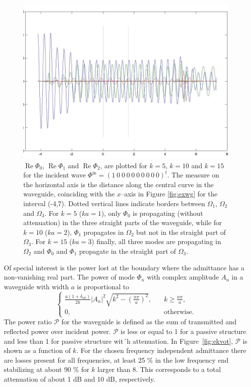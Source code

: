 \documentclass[numreferences]{kluwer}
\providecommand{\abs}[1]{\left\lvert#1\right\rvert}
\renewcommand{\Phi}{\varPhi}
\renewcommand{\Re}{\operatorname{Re}}
\renewcommand{\vec}[1]{\bm{#1}}
\renewcommand{\Phi}{\varPhi}
\newcommand{\Phiin}{\vec\Phi^{\text{in}}}
\begin{document}
\begin{figure}[htb]
  \includegraphics[width=\linewidth]{phin3a}
  \caption{$\Re\Phi_0$, $\Re\Phi_1$ and $\Re\Phi_2$, are plotted for
    $k=5$, $k=10$ and $k=15$ for the incident wave $\Phiin=(1\ 0\ 0\
    0\ 0\ 0\ 0\ 0\ 0\ 0)^t$. The measure on the horizontal axis is the
    distance along the central curve in the waveguide, coinciding with
    the $x$--axis in Figure \ref{fig:exwg} for the interval
    (-4,7). Dotted vertical lines indicate borders between $\Omega_1$,
    $\Omega_2$ and $\Omega_3$. For $k=5$ ($ka=1$), only $\Phi_0$ is
    propagating (without attenuation) in the three straight parts of
    the waveguide, while for $k=10$ ($ka=2$), $\Phi_1$ propagates in
    $\Omega_2$ but not in the straight part of $\Omega_3$. For $k=15$
    ($ka=3$) finally, all three modes are propagating in $\Omega_2$
    and $\Phi_0$ and $\Phi_1$ propagate in the straight part of
    $\Omega_3$.}
  \label{fig:phi}
\end{figure}

Of special interest is the power lost at the boundary where the
admittance has a non-vanishing real part. The power of mode $\Phi_n$
with complex amplitude $A_n$ in a waveguide with width $a$ is
proportional to
\begin{equation}\label{eq:power}
  \begin{cases}
    \frac{a(1+\delta_{n0})}{2k}\abs{A_n}^2
    \sqrt{k^2-\left(\frac{n\pi}a\right)^2},\quad&
    k\ge\frac{n\pi}a,\\
    0,&\text{otherwise}.
  \end{cases}
\end{equation}
The power ratio $\mathcal P$ for the waveguide is defined as the sum
of transmitted and reflected power over incident power. $\mathcal P$
is less or equal to 1 for a passive structure and less than 1 for
passive structure wit´h attenuation. In Figure~\ref{fig:ekvot},
$\mathcal P$ is shown as a function of $k$. For the chosen frequency
independent admittance there are losses present for all frequencies,
at least 25 \% in the low frequency end stabilizing at about 90 \% for
$k$ larger than 8. This corresponds to a total attenuation of about 1
dB and 10 dB, respectively.
\end{document}
